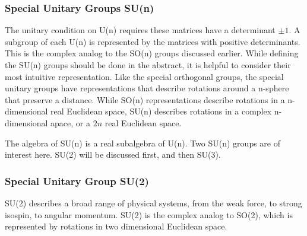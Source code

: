 \subsubsection{Special Unitary Groups SU(n)}\label{sec:specialUnitary}
The unitary condition on U(n) requires these matrices have a determinant $\pm1$.
A subgroup of each U(n) is represented by the matrices with positive determinants.
This is the complex analog to the SO(n) groups discussed earlier.
While defining the SU(n) groups should be done in the abstract, it is helpful to consider their most intuitive representation.
Like the special orthogonal groups, the special unitary groups have representations that describe rotations around a n-sphere that preserve a distance.
While SO(n) representations describe rotations in a n-dimensional real Euclidean space, SU(n) describes rotations in a complex n-dimensional apace, or a $2n$ real Euclidean space. \check

The algebra of SU(n) is a real subalgebra of U(n).
Two SU(n) groups are of interest here. 
SU(2) will be discussed first, and then SU(3).

\subsubsection{Special Unitary Group SU(2)}
SU(2) describes a broad range of physical systems, from the weak force, to strong isospin, to angular momentum.
SU(2) is the complex analog to SO(2), which is represented by rotations in two dimensional Euclidean space.

